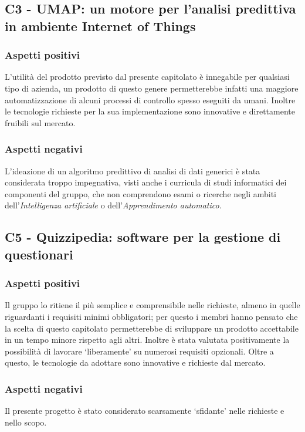 \subsection{C3 - UMAP: un motore per l'analisi predittiva in ambiente Internet of Things}
\subsubsection{Aspetti positivi}
L'utilit\`a del prodotto previsto dal presente capitolato \`e innegabile per qualsiasi tipo di azienda,
un prodotto di questo genere permetterebbe infatti una maggiore automatizzazione di alcuni
processi di controllo spesso eseguiti da umani.
Inoltre le tecnologie richieste per la sua implementazione sono innovative e direttamente fruibili sul mercato.

\subsubsection{Aspetti negativi}
L'ideazione di un algoritmo predittivo di analisi di dati generici è stata considerata troppo impegnativa,
visti anche i curricula di studi informatici dei componenti del gruppo, che non comprendono esami
o ricerche negli ambiti dell'\textit{Intelligenza artificiale} o dell'\textit{Apprendimento automatico}.


\subsection{C5 - Quizzipedia: software per la gestione di questionari}
\subsubsection{Aspetti positivi}
Il gruppo lo ritiene il pi\`u semplice e comprensibile nelle richieste, almeno in quelle
riguardanti i requisiti minimi obbligatori; per questo i membri hanno pensato che la scelta 
di questo capitolato permetterebbe di sviluppare un prodotto accettabile in un tempo minore
rispetto agli altri. 
Inoltre \`e stata valutata positivamente la possibilit\`a di lavorare `liberamente'
su numerosi requisiti opzionali. 
Oltre a questo, le tecnologie da adottare sono innovative e richieste dal mercato.
\subsubsection{Aspetti negativi}
Il presente progetto \`e stato considerato scarsamente `sfidante' nelle richieste e nello scopo.

